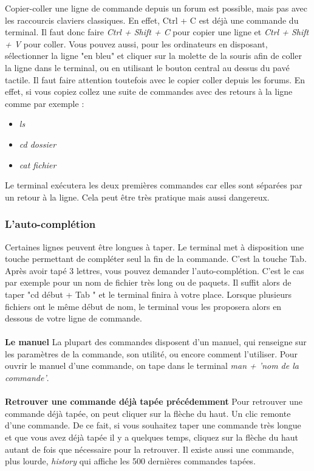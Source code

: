 Copier-coller une ligne de commande depuis un forum est possible, mais pas avec les raccourcis claviers classiques.
 En effet, Ctrl + C est déjà une commande du terminal. Il faut donc faire \textit{Ctrl + Shift + C}
 pour copier une ligne et \textit{Ctrl + Shift + V} pour coller. Vous pouvez aussi, pour les ordinateurs en disposant,
  sélectionner la ligne "en bleu" et cliquer sur la molette de la souris afin de coller la ligne dans le terminal,
  ou en utilisant le bouton central au dessus du pavé tactile.
Il faut faire attention toutefois avec le copier coller depuis les forums. En effet, si vous copiez collez une suite de
 commandes avec des retours à la ligne comme par exemple :

\begin{itemize}
\item \textit{ls}
\item \textit{cd dossier}
\item \textit{cat fichier}
\end{itemize}

Le terminal exécutera les deux premières commandes car elles sont séparées par un retour à la ligne. Cela peut être très pratique mais aussi dangereux.
\subsubsection{L'auto-complétion}
Certaines lignes peuvent être longues à taper. Le terminal met à disposition une touche permettant de compléter seul la fin de
la commande. C'est la touche Tab. Après avoir tapé 3 lettres, vous pouvez demander l'auto-complétion.
C'est le cas par exemple pour un nom de fichier très long ou de paquets. Il suffit alors de taper "cd début + Tab " et
le terminal finira à votre place. Lorsque plusieurs fichiers ont le même début de nom, le terminal vous les proposera alors
en dessous de votre ligne de commande.

\paragraph{}
\textbf{Le manuel}
La plupart des commandes disposent d'un manuel, qui renseigne sur les paramètres de la commande, son utilité,
ou encore comment l'utiliser. Pour ouvrir le manuel d'une commande, on tape dans le terminal \textit{man + 'nom de la commande'}.

\paragraph{}
\textbf{Retrouver une commande déjà tapée précédemment}
Pour retrouver une commande déjà tapée, on peut cliquer sur la flèche du haut. Un clic remonte d'une commande.
 De ce fait, si vous souhaitez taper une commande très longue et que vous avez déjà tapée il y a quelques temps,
 cliquez sur la flèche du haut autant de fois que nécessaire pour la retrouver.
Il existe aussi une commande, plus lourde, \textit{history} qui affiche les 500 dernières commandes tapées.

